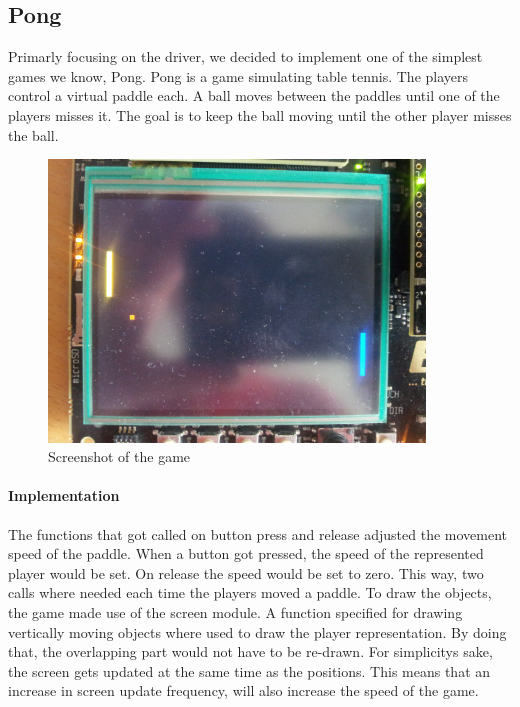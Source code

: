 \subsection{Pong}
\label{subsection:pong}
Primarly focusing on the driver, we decided to implement one of the simplest games we know, Pong. Pong is a game simulating table tennis. The players control a virtual paddle each. A ball moves between the paddles until one of the players misses it. The goal is to keep the ball moving until the other player misses the ball.
\begin{figure}[h]
	\label{fig:pong_screenshot}
	\centering
	\includegraphics[width=10cm]{img/pong_screen.jpg}
	\caption{Screenshot of the game}
\end{figure}
\paragraph{Implementation} The functions that got called on button press and release adjusted the movement speed of the paddle. When a button got pressed, the speed of the represented player would be set. On release the speed would be set to zero. This way, two calls where needed each time the players moved a paddle. To draw the objects, the game made use of the screen module. A function specified for drawing vertically moving objects where used to draw the player representation. By doing that, the overlapping part would not have to be re-drawn. For simplicitys sake, the screen gets updated at the same time as the positions. This means that an increase in screen update frequency, will also increase the speed of the game. 
